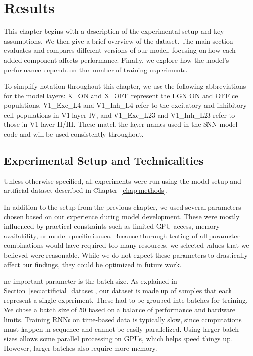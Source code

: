 \chapter{Results}
\label{chap:results}

This chapter begins with a description of the experimental setup and key assumptions. We then give a brief overview of the dataset. The main section evaluates and compares different versions of our model, focusing on how each added component affects performance. Finally, we explore how the model's performance depends on the number of training experiments.

To simplify notation throughout this chapter, we use the following abbreviations for the model layers: X\_ON and X\_OFF represent the LGN ON and OFF cell populations. V1\_Exc\_L4 and V1\_Inh\_L4 refer to the excitatory and inhibitory cell populations in V1 layer IV, and V1\_Exc\_L23 and V1\_Inh\_L23 refer to those in V1 layer II/III. These match the layer names used in the SNN model code and will be used consistently throughout.

\section{Experimental Setup and Technicalities}
\label{sec:experimental_setup}

Unless otherwise specified, all experiments were run using the model setup and artificial dataset described in Chapter~\ref{chap:methods}.

In addition to the setup from the previous chapter, we used several parameters chosen based on our experience during model development. These were mostly influenced by practical constraints such as limited GPU access, memory availability, or model-specific issues. Because thorough testing of all parameter combinations would have required too many resources, we selected values that we believed were reasonable. While we do not expect these parameters to drastically affect our findings, they could be optimized in future work.

ne important parameter is the batch size. As explained in Section~\ref{sec:artificial_dataset}, our dataset is made up of samples that each represent a single experiment. These had to be grouped into batches for training. We chose a batch size of $50$ based on a balance of performance and hardware limits. Training RNNs on time-based data is typically slow, since computations must happen in sequence and cannot be easily parallelized. Using larger batch sizes allows some parallel processing on GPUs, which helps speed things up. However, larger batches also require more memory.

